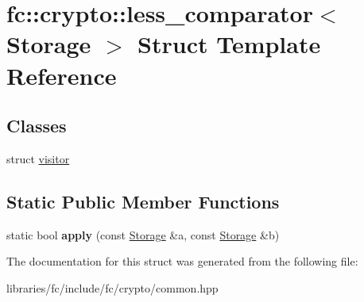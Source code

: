\hypertarget{structfc_1_1crypto_1_1less__comparator}{}\section{fc\+:\+:crypto\+:\+:less\+\_\+comparator$<$ Storage $>$ Struct Template Reference}
\label{structfc_1_1crypto_1_1less__comparator}
\subsection*{Classes}
\begin{DoxyCompactItemize}
\item 
struct \mbox{\hyperlink{structfc_1_1crypto_1_1less__comparator_1_1visitor}{visitor}}
\end{DoxyCompactItemize}
\subsection*{Static Public Member Functions}
\begin{DoxyCompactItemize}
\item 
\mbox{\label{structfc_1_1crypto_1_1less__comparator_a4438836e0eb1acb5b7025da1be4ebae1}} 
static bool {\bfseries apply} (const \mbox{\hyperlink{struct_storage}{Storage}} \&a, const \mbox{\hyperlink{struct_storage}{Storage}} \&b)
\end{DoxyCompactItemize}


The documentation for this struct was generated from the following file\+:\begin{DoxyCompactItemize}
\item 
libraries/fc/include/fc/crypto/common.\+hpp\end{DoxyCompactItemize}

